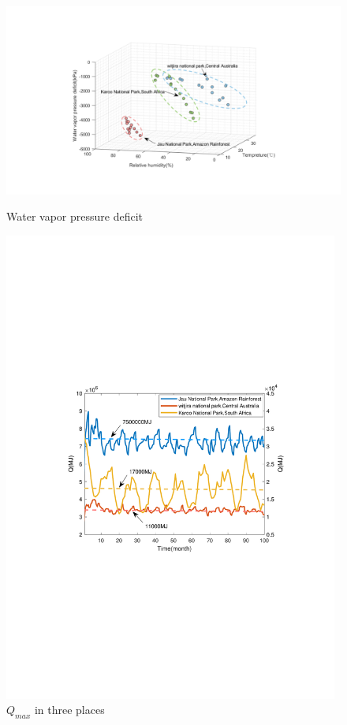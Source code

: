 \documentclass[12pt]{article}  %
\begin{document}
\begin{figure}[htbp]
	\centering
	\begin{minipage}[t]{0.5\textwidth}
		\centering
		\includegraphics[width=1\textwidth]{easymcm/img/VPD.pdf}
		\caption{Water vapor pressure deficit}\label{fig:var}
	\end{minipage}
	\begin{minipage}[t]{0.4\textwidth}
		\centering
		\includegraphics[width=0.98\textwidth]{easymcm/img/Qlast.pdf}
		\caption{$Q_{max}$ in three places}\label{fig:qlast}
	\end{minipage}
\end{figure}
\end{document}
